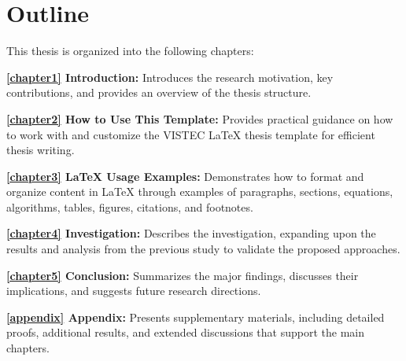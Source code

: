 \section{Outline}
\label{ch1:sec:outline}
\begin{paragraph}
This thesis is organized into the following chapters:

\textbf{\autoref{chapter1} Introduction:}  
Introduces the research motivation, key contributions, and provides an overview of the thesis structure.

\textbf{\autoref{chapter2} How to Use This Template:}  
Provides practical guidance on how to work with and customize the VISTEC \LaTeX{} thesis template for efficient thesis writing.

\textbf{\autoref{chapter3} LaTeX Usage Examples:}  
Demonstrates how to format and organize content in \LaTeX{} through examples of paragraphs, sections, equations, algorithms, tables, figures, citations, and footnotes.

\textbf{\autoref{chapter4} Investigation:}  
Describes the investigation, expanding upon the results and analysis from the previous study to validate the proposed approaches.

\textbf{\autoref{chapter5} Conclusion:}  
Summarizes the major findings, discusses their implications, and suggests future research directions.

\textbf{\autoref{appendix} Appendix:}  
Presents supplementary materials, including detailed proofs, additional results, and extended discussions that support the main chapters.
\end{paragraph}
